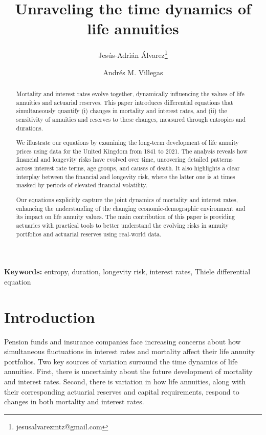 \documentclass[12pt]{article}
\title{Unraveling the time dynamics of life annuities}
\author[1]{Jes\'us-Adri\'an \'Alvarez\thanks{jesusalvarezmtz@gmail.com}}
\author[2]{Andr\'es M. Villegas}
\affil[1]{{\small Independent Researcher} }
\affil[2]{\small{School of Risk and Actuarial Studies\\ UNSW Business School, UNSW Sydney, Australia}}
\begin{document}
\maketitle

{
\setcounter{tocdepth}{2}
}



\begin{abstract}
	
Mortality and interest rates evolve together, dynamically influencing the values of life annuities and actuarial reserves. This paper introduces differential equations that simultaneously quantify (i) changes in mortality and interest rates, and (ii) the sensitivity of annuities and reserves to these changes, measured through entropies and durations.

We illustrate our equations by examining the long-term development of life annuity prices using data for the United Kingdom from 1841 to 2021. The analysis reveals how financial and longevity risks have evolved over time, uncovering detailed patterns across interest rate terms, age groups, and causes of death. It also highlights a clear interplay between the financial and longevity risk, where the latter one is at times masked by periods of elevated financial volatility.

Our equations explicitly capture the joint dynamics of mortality and interest rates, enhancing the understanding of the changing economic-demographic environment and its impact on life annuity values. The main contribution of this paper is providing actuaries with practical tools to better understand the evolving risks in annuity portfolios and actuarial reserves using real-world data.

	
\end{abstract}

\textbf{Keywords:} entropy, duration, longevity risk, interest rates, Thiele differential equation


\newpage
\section{Introduction}\label{sec:1_introduction}


Pension funds and insurance companies face increasing concerns about how simultaneous fluctuations in interest rates and mortality affect their life annuity portfolios. Two key sources of variation surround the time dynamics of life annuities. First, there is uncertainty about the future development of mortality and interest rates. Second, there is variation in how life annuities, along with their corresponding actuarial reserves and capital requirements, respond to changes in both mortality and interest rates. 
\end{document}
